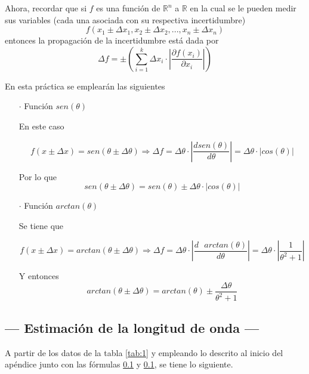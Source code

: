 \documentclass[12pt,a4paper]{article}
\begin{document}
 	
 	Ahora, recordar que si $f$ es una función de $\mathbb{R}^n$ a $\mathbb{R}$ en la cual se le pueden medir sus variables (cada una asociada con su respectiva incertidumbre)
 	$$f(x_1\pm\Delta x_1,x_2\pm\Delta x_2,...,x_n\pm\Delta x_n)$$
 	entonces la propagación de la incertidumbre está dada por 
 	$$\Delta f=\pm\left(\displaystyle\sum_{i=1}^k\Delta x_i\cdot\left|\dfrac{\partial f(x_i)}{\partial x_i}\right| \right)$$
 	
 	En esta práctica se emplearán las siguientes
 	
 	\begin{itemize}
 		\item [$\cdot$] Función $ sen(\theta) $
 		
 		En este caso
 		
 		$$f(x\pm\Delta x)=sen(\theta\pm\Delta\theta)\Longrightarrow \Delta f=\Delta\theta\cdot\left|\dfrac{d sen(\theta)}{d\theta}\right|=\Delta\theta\cdot|cos(\theta)|$$
 		
 		Por lo que 
 		$$sen(\theta\pm\Delta\theta)=sen(\theta)\pm\Delta\theta\cdot|cos(\theta)|$$
 		
 		\item [$\cdot$] Función $ arctan(\theta) $
 		
 		Se tiene que 
 		
 		$$f(x\pm\Delta x)=arctan(\theta\pm\Delta\theta)\Longrightarrow \Delta f=\Delta\theta\cdot\left|\dfrac{d \mbox{ }arctan(\theta)}{d\theta}\right|=\Delta\theta\cdot\left|\dfrac{1}{\theta^2 + 1 }\right|$$
 		
 		Y entonces 
 		$$arctan(\theta\pm\Delta\theta)=arctan(\theta)\pm \dfrac{\Delta\theta}{\theta^2 + 1 }$$
 		
 	\end{itemize} 
 	
 	\newpage
 	\subsection{--- Estimación de la longitud de onda ---}
 	
 	A partir de los datos de la tabla \ref{tab:1} y empleando lo descrito al inicio del apéndice junto con las fórmulas \ref{} y \ref{}, se tiene lo siguiente.
 	
\end{document}
